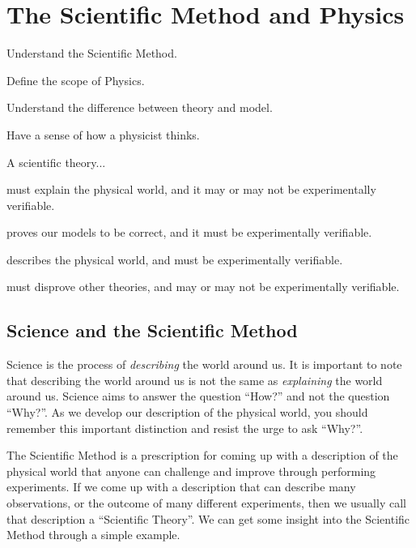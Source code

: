 
\chapter{The Scientific Method and Physics}
\label{chap:introduction}

\begin{learningObjectives}
{\item Understand the Scientific Method.
\item Define the scope of Physics.
\item Understand the difference between theory and model.
\item Have a sense of how a physicist thinks.}
\end{learningObjectives}
\begin{opening}
\begin{MCquestion}{A scientific theory...}
\item must explain the physical world, and it may or may not be experimentally verifiable.
\item proves our models to be correct, and it must be experimentally verifiable.
\item describes the physical world, and must be experimentally verifiable. \correct
\item must disprove other theories, and may or may not be experimentally verifiable.
\end{MCquestion}
\end{opening}
\vspace{0.5cm}
\section{Science and the Scientific Method}
Science is the process of \textit{describing} the world around us. It is important to note that describing the world around us is not the same as \textit{explaining} the world around us. Science aims to answer the question ``How?'' and not the question ``Why?''. As we develop our description of the physical world, you should remember this important distinction and resist the urge to ask ``Why?''.

The Scientific Method is a prescription for coming up with a description of the physical world that anyone can challenge and improve through performing experiments. If we come up with a description that can describe many observations, or the outcome of many different experiments, then we usually call that description a ``Scientific Theory''. We can get some insight into the Scientific Method through a simple example. 

